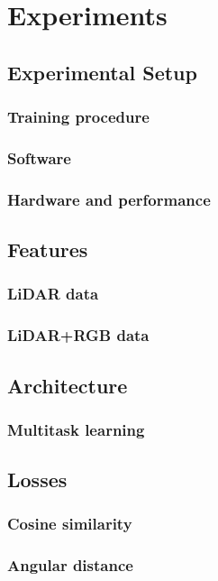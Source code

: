 \chapter{Experiments}%
\label{sec:experiments}

\section{Experimental Setup}
\subsection{Training procedure}
\subsection{Software}
\subsection{Hardware and performance}

\section{Features}
\subsection{LiDAR data}
\subsection{LiDAR+RGB data}

\section{Architecture}
\subsection{Multitask learning}

\section{Losses}
\subsection{Cosine similarity}
\subsection{Angular distance}

